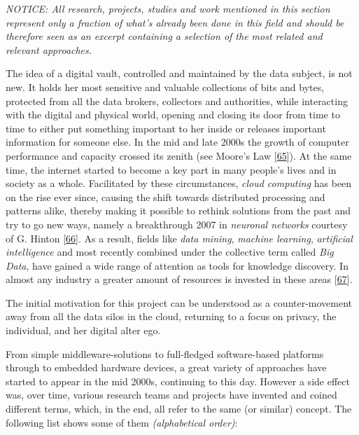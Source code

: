 \documentclass[12pt,english,a4paper,titlepage,cleardoublepage=empty,dottedtoc]{report}
\begin{document}
\emph{NOTICE: All research, projects, studies and work mentioned in this
section represent only a fraction of what's already been done in this
field and should be therefore seen as an excerpt containing a selection
of the most related and relevant approaches.}

The idea of a digital vault, controlled and maintained by the data
subject, is not new. It holds her most sensitive and valuable
collections of bits and bytes, protected from all the data brokers,
collectors and authorities, while interacting with the digital and
physical world, opening and closing its door from time to time to either
put something important to her inside or releases important information
for someone else. In the mid and late 2000s the growth of computer
performance and capacity crossed its zenith (see Moore's Law
{[}\protect\hyperlink{ref-paper_1965_moors-law}{65}{]}). At the same
time, the internet started to become a key part in many people's lives
and in society as a whole. Facilitated by these circumstances,
\emph{cloud computing} has been on the rise ever since, causing the
shift towards distributed processing and patterns alike, thereby making
it possible to rethink solutions from the past and try to go new ways,
namely a breakthrough 2007 in \emph{neuronal networks} courtesy of G.
Hinton
{[}\protect\hyperlink{ref-podcast_2015_cre-neuronale-netze}{66}{]}. As a
result, fields like \emph{data mining}, \emph{machine learning},
\emph{artificial intelligence} and most recently combined under the
collective term called \emph{Big Data}, have gained a wide range of
attention as tools for knowledge discovery. In almost any industry a
greater amount of resources is invested in these areas
{[}\protect\hyperlink{ref-web_2016_industries-intention-to-invest-in-big-data}{67}{]}.

The initial motivation for this project can be understood as a
counter-movement away from all the data silos in the cloud, returning to
a focus on privacy, the individual, and her digital alter ego.

From simple middleware-solutions to full-fledged software-based
platforms through to embedded hardware devices, a great variety of
approaches have started to appear in the mid 2000s, continuing to this
day. However a side effect was, over time, various research teams and
projects have invented and coined different terms, which, in the end,
all refer to the same (or similar) concept. The following list shows
some of them \emph{(alphabetical order)}:
\end{document}
